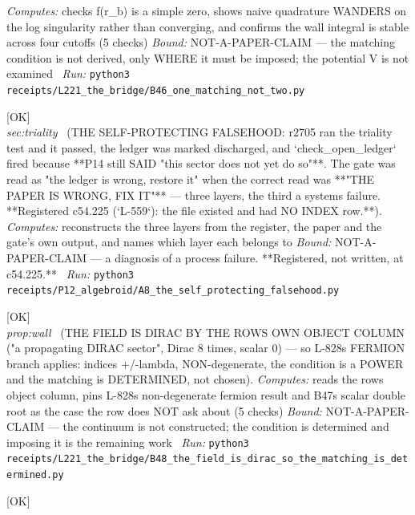 \begin{description}
\emph{Computes:} checks f(r\_b) is a simple zero, shows naive quadrature WANDERS on the log singularity rather than converging, and confirms the wall integral is stable across four cutoffs (5 checks)
 \emph{Bound:} NOT-A-PAPER-CLAIM --- the matching condition is not derived, only WHERE it must be imposed; the potential V is not examined
\ \emph{Run:} \texttt{python3 receipts/L221\_the\_bridge/B46\_one\_matching\_not\_two.py}
\item[\rcptlabel{A8_the_self_protecting_falsehood}{P12R18}\textbf{P12R18}\quad\texttt{A8\_the\_self\_protecting\_falsehood}]\hfill\textsf{[OK]}\\
\textit{sec:triality} \ (THE SELF-PROTECTING FALSEHOOD: r2705 ran the triality test and it passed, the ledger was marked discharged, and `check\_open\_ledger` fired because **P14 still SAID "this sector does not yet do so"**. The gate was read as "the ledger is wrong, restore it" when the correct read was **"THE PAPER IS WRONG, FIX IT"** --- three layers, the third a systems failure. **Registered c54.225 (`L-559`): the file existed and had NO INDEX row.**). 
\emph{Computes:} reconstructs the three layers from the register, the paper and the gate's own output, and names which layer each belongs to
 \emph{Bound:} NOT-A-PAPER-CLAIM --- a diagnosis of a process failure. **Registered, not written, at c54.225.**
\ \emph{Run:} \texttt{python3 receipts/P12\_algebroid/A8\_the\_self\_protecting\_falsehood.py}
\item[\label{rcpt:B48_the_field_is_dirac_so_the_matching_is_determined}\textbf{}\quad\texttt{B48\_the\_field\_is\_dirac\_so\_the\_matching\_is\_determined}]\hfill\textsf{[OK]}\\
\textit{prop:wall} \ (THE FIELD IS DIRAC BY THE ROWS OWN OBJECT COLUMN ("a propagating DIRAC sector", Dirac 8 times, scalar 0) --- so L-828s FERMION branch applies: indices +/-lambda, NON-degenerate, the condition is a POWER and the matching is DETERMINED, not chosen). 
\emph{Computes:} reads the rows object column, pins L-828s non-degenerate fermion result and B47s scalar double root as the case the row does NOT ask about (5 checks)
 \emph{Bound:} NOT-A-PAPER-CLAIM --- the continuum is not constructed; the condition is determined and imposing it is the remaining work
\ \emph{Run:} \texttt{python3 receipts/L221\_the\_bridge/B48\_the\_field\_is\_dirac\_so\_the\_matching\_is\_determined.py}
\item[\label{rcpt:B52_the_missing_f2_is_entailed_by_the_delivery}\textbf{}\quad\texttt{B52\_the\_missing\_f2\_is\_entailed\_by\_the\_delivery}]\hfill\textsf{[OK]}\\

\end{description}
